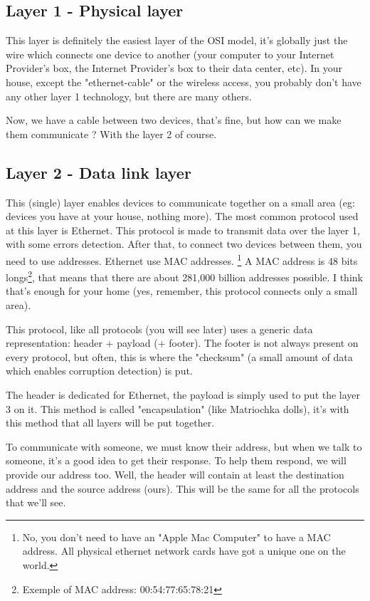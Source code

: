 \documentclass{article}
\begin{document}
	\subsection{Layer 1 - Physical layer}
	
	This layer is definitely the easiest layer of the OSI model, it's globally just the wire which connects one
	device to another (your computer to your Internet Provider's box, the Internet Provider's box to their
	data center, etc). In your house, except the "ethernet-cable" or the wireless access, you probably don't have
	any other layer 1 technology, but there are many others.
	
	Now, we have a cable between two devices, that's fine, but how can we make them communicate ?
	With the layer 2 of course.

	\subsection{Layer 2 - Data link layer}
	
	This (single) layer enables devices to communicate together on a small area (eg: devices you have at your house,
	nothing more). The most common protocol used at this layer is Ethernet. This protocol is made to transmit data
	over the layer 1, with some errors detection. After that, to connect two devices between them, you
	need to use addresses. Ethernet use MAC addresses.
	\footnote{No, you don't need to have an "Apple Mac Computer" to have a MAC address.
	All physical ethernet network cards have got a unique one on the world.}
	A MAC address is 48 bits longs\footnote{Exemple of MAC address: 00:54:77:65:78:21},
	that means that there are about 281,000 billion addresses possible. I think that's enough for
	your home (yes, remember, this protocol connects only a small area).
	
	This protocol, like all protocols (you will see later) uses a generic data representation:
	header + payload (+ footer).
	The footer is not always present on every protocol, but often, this is where the "checksum" (a small amount of data
	which enables corruption detection) is put.
	
	The header is dedicated for Ethernet, the payload is simply used to put
	the layer 3 on it. This method is called "encapsulation" (like Matriochka dolls), it's with this method that all layers
	will be put together.
	
	To communicate with someone, we must know their address, but when we talk to someone, it's a good idea to
	get their response. To help them respond, we will provide our address too. Well, the header will contain
	at least the destination address and the source address (ours). This will be the same for all the protocols
	that we'll see.
	
\end{document}
